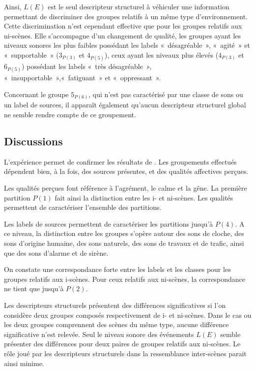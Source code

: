 Ainsi, $L(E)$ est le seul descripteur structurel à véhiculer une information permettant de discriminer des groupes relatifs à un même type d'environnement. Cette discrimination n'est cependant effective que pour les groupes relatifs aux ni-scènes. Elle s'accompagne d'un changement de qualité, les groupes ayant les niveaux sonores les plus faibles possédant les labels «~désagréable~», «~agité~» et «~supportable~» ($3_{P(3)}$ et $4_{P(5)}$), ceux ayant les niveaux plus élevés ($4_{P(3)}$ et $6_{P(5)}$) possédant les labels «~très désagréable~», «~insupportable~»,«~fatiguant~» et «~oppressant~».

Concernant le groupe $5_{P(6)}$, qui n'est pas caractérisé par une classe de sons ou un label de sources, il apparaît également qu'aucun descripteur structurel global ne semble rendre compte de ce groupement.



\subsection{Discussions}

L'expérience permet de confirmer les résultats de \citep{maffiolo_caracterisation_1999}. Les groupements effectués dépendent bien, à la fois, des sources présentes, et des qualités affectives perçues.

Les qualités perçues font référence à l'agrément, le calme et la gêne. La première partition $P(1)$ fait ainsi la distinction entre les i- et ni-scènes. Les qualités permettent de caractériser l'ensemble des partitions.

Les labels de sources permettent de caractériser les partitions jusqu'à $P(4)$. A ce niveau, la distinction entre les groupes s'opère autour des sons de cloche, des sons d'origine humaine, des sons naturels, des sons de travaux et de trafic, ainsi que des sons d'alarme et de sirène.

On constate une correspondance forte entre les labels et les classes pour les groupes relatifs aux i-scènes. Pour ceux relatifs aux ni-scènes, la correspondance ne tient que jusqu'à $P(2)$.

Les descripteurs structurels présentent des différences significatives si l'on considère deux groupes composés respectivement de i- et ni-scènes. Dans le cas ou les deux groupes comprennent des scènes du même type, aucune différence significative n'est relevée. Seul le niveau sonore des événements $L(E)$ semble présenter des différences pour deux paires de groupes relatifs aux ni-scènes. Le rôle joué par les descripteurs structurels dans la ressemblance inter-scènes parait ainsi minime.

